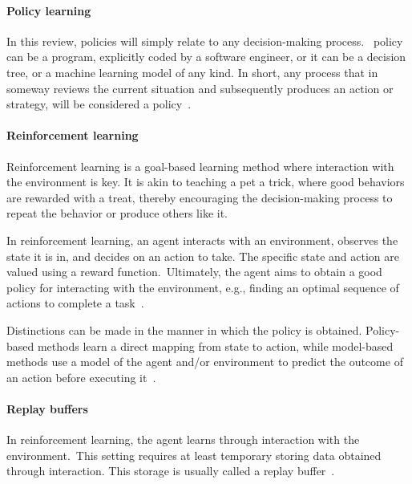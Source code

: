 \paragraph{Policy learning}
In this review, policies will simply relate to any decision-making process.\  policy can be a program, explicitly coded by a software engineer, or it can be a decision tree, or a machine learning model of any kind.
In short, any process that in someway reviews the current situation and subsequently produces an action or strategy, will be considered a policy~.

\paragraph{Reinforcement learning}\label{par:RL}
Reinforcement learning is a goal-based learning method where interaction with the environment is key.
It is akin to teaching a pet a trick, where good behaviors are rewarded with a treat, thereby encouraging the decision-making process to repeat the behavior or produce others like it.

In reinforcement learning, an agent interacts with an environment, observes the state it is in, and decides on an action to take.
The specific state and action are valued using a reward function.\ Ultimately, the agent aims to obtain a good policy for interacting with the environment, e.g., finding an optimal sequence of actions to complete a task~\cite{Zhang2021, Han2023a, Bhagat2019}.

Distinctions can be made in the manner in which the policy is obtained.
Policy-based methods learn a direct mapping from state to action, while model-based methods use a model of the agent and/or environment to predict the outcome of an action before executing it~\cite{Zhang2021}.

\paragraph{Replay buffers}
In reinforcement learning, the agent learns through interaction with the environment.\ This setting requires at least temporary storing data obtained through interaction.
This storage is usually called a replay buffer~.
